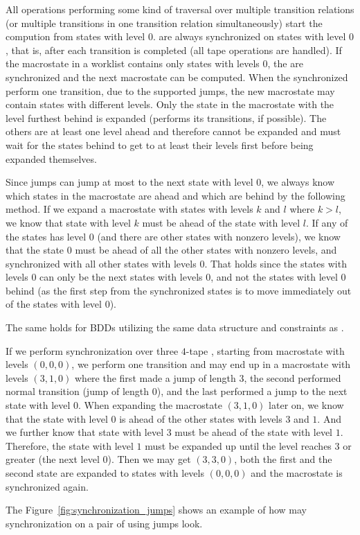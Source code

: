All operations performing some kind of traversal over multiple transition relations (or multiple transitions in one transition relation simultaneously) start the compution from states with level $0$.
\nfts are always synchronized on states with level $0$, that is, after each \nft transition is completed (all tape operations are handled).
If the macrostate in a worklist contains only states with levels $0$, the \nfts are synchronized and the next macrostate can be computed.
When the synchronized \nfts perform one transition, due to the supported jumps, the new macrostate may contain states with different levels.
Only the state in the macrostate with the level furthest behind is expanded (performs its transitions, if possible).
The others are at least one level ahead and therefore cannot be expanded and must wait for the states behind to get to at least their levels first before being expanded themselves.

Since jumps can jump at most to the next state with level $0$, we always know which states in the macrostate are ahead and which are behind by the following method.
If we expand a macrostate with states with levels $k$ and $l$ where $k > l$, we know that state with level $k$ must be ahead of the state with level $l$.
If any of the states has level $0$ (and there are other states with nonzero levels), we know that the state $0$ must be ahead of all the other states with nonzero levels, and synchronized with all other states with levels $0$.
That holds since the states with levels $0$ can only be the next states with levels $0$, and not the states with level $0$ behind (as the first step from the synchronized states is to move immediately out of the states with level $0$).

The same holds for BDDs utilizing the same data structure and constraints as \nfts.

\begin{example}
  If we perform synchronization over three $4$-tape \nfts, starting from macrostate with levels $(0, 0, 0)$, we perform one transition and may end up in a macrostate with levels $(3, 1, 0)$ where the first \nft made a jump of length $3$, the second performed normal transition (jump of length $0$), and the last \nft performed a jump to the next state with level $0$.
  When expanding the macrostate $(3, 1, 0)$ later on, we know that the state with level $0$ is ahead of the other states with levels $3$ and $1$. And we further know that state with level $3$ must be ahead of the state with level $1$. Therefore, the state with level $1$ must be expanded up until the level reaches $3$ or greater (the next level $0$).
  Then we may get $(3, 3, 0)$, both the first and the second state are expanded to states with levels $(0, 0, 0)$ and the macrostate is synchronized again.

  The Figure~\ref{fig:synchronization_jumps} shows an example of how may synchronization on a pair of \nfts using jumps look.
\end{example}

